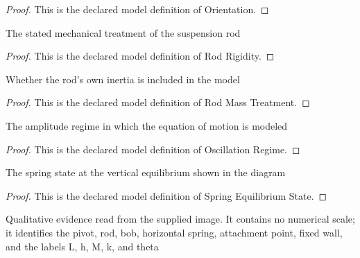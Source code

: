 \begin{proof}
  This is the declared model definition of Orientation.
\end{proof}
\begin{definition}
  \label{def:physics:phyx-mini-0233:phyxminiproblems-problemphyxmini0233-rodrigidity}
  The stated mechanical treatment of the suspension rod
\end{definition}
\begin{proof}
  This is the declared model definition of Rod Rigidity.
\end{proof}
\begin{definition}
  \label{def:physics:phyx-mini-0233:phyxminiproblems-problemphyxmini0233-rodmasstreatment}
  Whether the rod's own inertia is included in the model
\end{definition}
\begin{proof}
  This is the declared model definition of Rod Mass Treatment.
\end{proof}
\begin{definition}
  \label{def:physics:phyx-mini-0233:phyxminiproblems-problemphyxmini0233-oscillationregime}
  The amplitude regime in which the equation of motion is modeled
\end{definition}
\begin{proof}
  This is the declared model definition of Oscillation Regime.
\end{proof}
\begin{definition}
  \label{def:physics:phyx-mini-0233:phyxminiproblems-problemphyxmini0233-springequilibriumstate}
  The spring state at the vertical equilibrium shown in the diagram
\end{definition}
\begin{proof}
  This is the declared model definition of Spring Equilibrium State.
\end{proof}
\begin{definition}
  \label{def:physics:phyx-mini-0233:phyxminiproblems-problemphyxmini0233-springpendulumfigure}
  Qualitative evidence read from the supplied image. It contains no numerical scale; it identifies the pivot, rod, bob, horizontal spring, attachment point, fixed wall, and the labels L, h, M, k, and theta
\end{definition}
